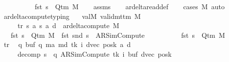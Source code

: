 \begin{isabellebody}
\ \ \ \ \ \ \ \ \ {\isasymand}\ fst\ s{\isacharprime}{\kern0pt}\ {\isasymin}\ Q{\isacharunderscore}{\kern0pt}tm\ M{\isachardoublequoteclose}\isanewline
%
\isadelimproof
\ \ %
\endisadelimproof
%
\isatagproof
{}\isamarkupfalse%
\ assms\isanewline
\ \ \isamarkupfalse%
\ ar{\isacharunderscore}{\kern0pt}delta{\isacharunderscore}{\kern0pt}read{\isacharunderscore}{\kern0pt}def\isanewline
\ \ \isamarkupfalse%
\ {\isacharparenleft}{\kern0pt}cases\ M{\isacharparenright}{\kern0pt}\ auto%
\endisatagproof
{\isafoldproof}%
%
\isadelimproof
\isanewline
%
\endisadelimproof
\isanewline
{}\isamarkupfalse%
\ ar{\isacharunderscore}{\kern0pt}delta{\isacharunderscore}{\kern0pt}compute{\isacharunderscore}{\kern0pt}typing{\isacharcolon}{\kern0pt}\isanewline
\ \ \ valM{\isacharcolon}{\kern0pt}\ {\isachardoublequoteopen}valid{\isacharunderscore}{\kern0pt}mttm\ M{\isachardoublequoteclose}\isanewline
\ \ \ \ \ tr{\isacharcolon}{\kern0pt}\ {\isachardoublequoteopen}{\isacharparenleft}{\kern0pt}s{\isacharcomma}{\kern0pt}\ a{\isacharcomma}{\kern0pt}\ s{\isacharprime}{\kern0pt}{\isacharcomma}{\kern0pt}\ a{\isacharprime}{\kern0pt}{\isacharcomma}{\kern0pt}\ d{\isacharparenright}{\kern0pt}\ {\isasymin}\ ar{\isacharunderscore}{\kern0pt}delta{\isacharunderscore}{\kern0pt}compute\ M{\isachardoublequoteclose}\isanewline
\ \ \ {\isachardoublequoteopen}fst\ s\ {\isasymin}\ Q{\isacharunderscore}{\kern0pt}tm\ M\ {\isasymand}\ fst\ {\isacharparenleft}{\kern0pt}snd\ s{\isacharparenright}{\kern0pt}\ {\isacharequal}{\kern0pt}\ AR{\isacharunderscore}{\kern0pt}SimCompute\isanewline
\ \ \ \ \ \ \ \ \ {\isasymand}\ fst\ s{\isacharprime}{\kern0pt}\ {\isasymin}\ Q{\isacharunderscore}{\kern0pt}tm\ M{\isachardoublequoteclose}\isanewline
%
\isadelimproof
%
\endisadelimproof
%
\isatagproof
{}\isamarkupfalse%
\ {\isacharminus}{\kern0pt}\isanewline
\ \ \isamarkupfalse%
\ tr\ \isamarkupfalse%
\ q\ buf\ q{\isacharprime}{\kern0pt}\ m{\isacharunderscore}{\kern0pt}a{\isacharprime}{\kern0pt}\ m{\isacharunderscore}{\kern0pt}d\ tk\ i\ dvec\ posk\ a{\isacharprime}{\kern0pt}{\isacharprime}{\kern0pt}\ d{\isacharprime}{\kern0pt}{\isacharprime}{\kern0pt}\isanewline
\ \ \ \ \ decomp{\isacharcolon}{\kern0pt}\ {\isachardoublequoteopen}s\ {\isacharequal}{\kern0pt}\ {\isacharparenleft}{\kern0pt}q{\isacharcomma}{\kern0pt}\ AR{\isacharunderscore}{\kern0pt}SimCompute{\isacharcomma}{\kern0pt}\ tk{\isacharcomma}{\kern0pt}\ i{\isacharcomma}{\kern0pt}\ buf{\isacharcomma}{\kern0pt}\ dvec{\isacharcomma}{\kern0pt}\ posk{\isacharparenright}{\kern0pt}{\isachardoublequoteclose}\isanewline

\end{isabellebody}
